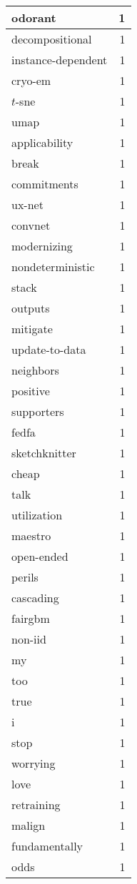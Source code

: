 \begin{table}[h]
\begin{tabular}{|l|r|}
\hline
odorant & 1 \\
\hline
decompositional & 1 \\
\hline
instance-dependent & 1 \\
\hline
cryo-em & 1 \\
\hline
$t$-sne & 1 \\
\hline
umap & 1 \\
\hline
applicability & 1 \\
\hline
break & 1 \\
\hline
commitments & 1 \\
\hline
ux-net & 1 \\
\hline
convnet & 1 \\
\hline
modernizing & 1 \\
\hline
nondeterministic & 1 \\
\hline
stack & 1 \\
\hline
outputs & 1 \\
\hline
mitigate & 1 \\
\hline
update-to-data & 1 \\
\hline
neighbors & 1 \\
\hline
positive & 1 \\
\hline
supporters & 1 \\
\hline
fedfa & 1 \\
\hline
sketchknitter & 1 \\
\hline
cheap & 1 \\
\hline
talk & 1 \\
\hline
utilization & 1 \\
\hline
maestro & 1 \\
\hline
open-ended & 1 \\
\hline
perils & 1 \\
\hline
cascading & 1 \\
\hline
fairgbm & 1 \\
\hline
non-iid & 1 \\
\hline
my & 1 \\
\hline
too & 1 \\
\hline
true & 1 \\
\hline
i & 1 \\
\hline
stop & 1 \\
\hline
worrying & 1 \\
\hline
love & 1 \\
\hline
retraining & 1 \\
\hline
malign & 1 \\
\hline
fundamentally & 1 \\
\hline
odds & 1 \\

\end{tabular}
\end{table}
